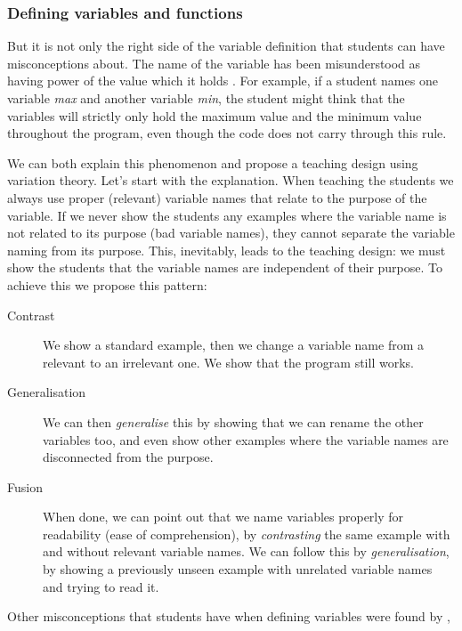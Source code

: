 \subsubsection{Defining variables and functions}

But it is not only the right side of the variable definition that students 
can 
have misconceptions about. The name of the variable has been misunderstood 
as 
having power of the value which it holds 
\parencite{MisconceptionsSurvey2017,Sleeman1984}. For example, if a student 
names one variable \emph{max} and another variable \emph{min}, the student 
might think that the variables will strictly only hold the maximum value and 
the minimum value throughout the program, even though the code does not 
carry through this rule. 

We can both explain this phenomenon and propose a teaching design using 
variation theory.
Let's start with the explanation.
When teaching the students we always use proper (\ie relevant) variable 
names 
that relate to the purpose of the variable.
If we never show the students any examples where the variable name is not 
related to its purpose (bad variable names), they cannot separate the 
variable 
naming from its purpose.
This, inevitably, leads to the teaching design:
we must show the students that the variable names are independent of their 
purpose. To achieve this we propose this pattern:

\begin{description}
    \item [Contrast] We show a standard example, then we change a variable 
name from a relevant to an irrelevant one. We show that the program 
still works.
    \item [Generalisation] We can then \emph{generalise} this by showing 
that we can rename the other variables too, and even show other 
examples where the variable names are disconnected from the purpose.
    \item [Fusion] When done, we can point out that we name variables 
properly for readability 
(ease of comprehension), by \emph{contrasting} the same example with and 
without relevant variable names.
We can follow this by \emph{generalisation}, by showing a previously unseen 
example with unrelated variable names and trying to read it.
\end{description}


Other misconceptions that students have when defining variables were found 
by \textcite{GuoMarkelZhang2020},

